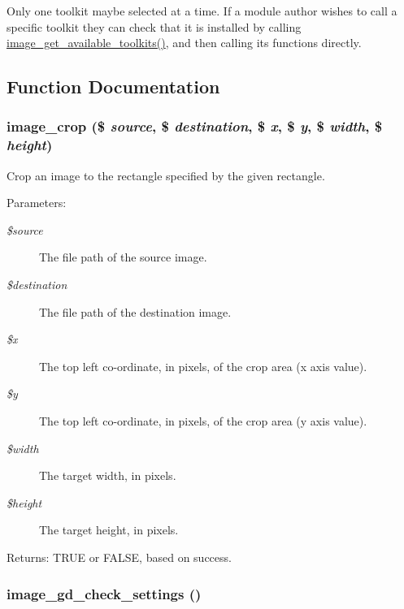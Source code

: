 Only one toolkit maybe selected at a time. If a module author wishes to call a specific toolkit they can check that it is installed by calling \hyperlink{group__image_g190b9b90f931916a5766ed11c29b9326}{image\_\-get\_\-available\_\-toolkits()}, and then calling its functions directly. 

\subsection{Function Documentation}
\hypertarget{group__image_ge43902efb776c55596b28161e835cd9e}{
\subsubsection[{image\_\-crop}]{\setlength{\rightskip}{0pt plus 5cm}image\_\-crop (\$ {\em source}, \/  \$ {\em destination}, \/  \$ {\em x}, \/  \$ {\em y}, \/  \$ {\em width}, \/  \$ {\em height})}}
\label{group__image_ge43902efb776c55596b28161e835cd9e}


Crop an image to the rectangle specified by the given rectangle.

\begin{Desc}
\item[Parameters:]
\begin{description}
\item[{\em \$source}]The file path of the source image. \item[{\em \$destination}]The file path of the destination image. \item[{\em \$x}]The top left co-ordinate, in pixels, of the crop area (x axis value). \item[{\em \$y}]The top left co-ordinate, in pixels, of the crop area (y axis value). \item[{\em \$width}]The target width, in pixels. \item[{\em \$height}]The target height, in pixels. \end{description}
\end{Desc}
\begin{Desc}
\item[Returns:]TRUE or FALSE, based on success. \end{Desc}
\hypertarget{group__image_g1926e8b1932480b81427c1301e8eb4dc}{
\subsubsection[{image\_\-gd\_\-check\_\-settings}]{\setlength{\rightskip}{0pt plus 5cm}image\_\-gd\_\-check\_\-settings ()}}
\label{group__image_g1926e8b1932480b81427c1301e8eb4dc}


